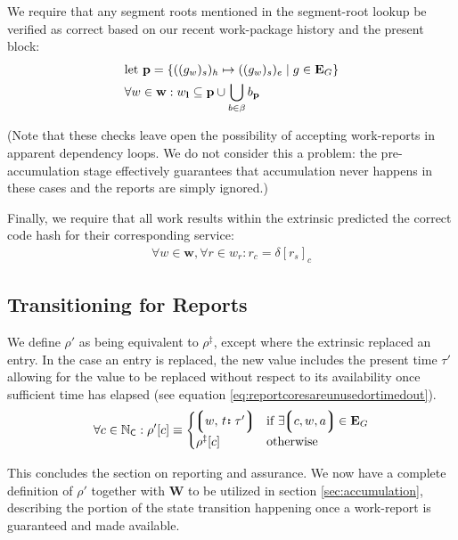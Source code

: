 We require that any segment roots mentioned in the segment-root lookup be verified as correct based on our recent work-package history and the present block:
\begin{align}
  &\text{let } \mathbf{p} = \{ ((g_w)_s)_h \mapsto ((g_w)_s)_e \mid g \in \mathbf{E}_G \} \\
  &\forall w \in \mathbf{w}: w_\mathbf{l} \subseteq \mathbf{p} \cup \bigcup_{b \in \beta} b_\mathbf{p}
\end{align}

(Note that these checks leave open the possibility of accepting work-reports in apparent dependency loops. We do not consider this a problem: the pre-accumulation stage effectively guarantees that accumulation never happens in these cases and the reports are simply ignored.)

Finally, we require that all work results within the extrinsic predicted the correct code hash for their corresponding service:
\begin{align}\label{eq:reportcodesarecorrect}
  \forall w \in \mathbf{w}, \forall r \in w_r : r_c = \delta[r_s]_c
\end{align}









\subsection{Transitioning for Reports}

We define $\rho'$ as being equivalent to $\rho^\ddagger$, except where the extrinsic replaced an entry. In the case an entry is replaced, the new value includes the present time $\tau'$ allowing for the value to be replaced without respect to its availability once sufficient time has elapsed (see equation \ref{eq:reportcoresareunusedortimedout}).
\begin{equation}
    \forall c \in \N_\mathsf{C} : \rho'[c] \equiv \begin{cases}
      \tup{w\ts\is{t}{\tau'}} &\when \exists \tup{c, w, a} \in \xtguarantees \\
      \rho^\ddagger[c] &\otherwise
    \end{cases}
\end{equation}

This concludes the section on reporting and assurance. We now have a complete definition of $\rho'$ together with $\mathbf{W}$ to be utilized in section \ref{sec:accumulation}, describing the portion of the state transition happening once a work-report is guaranteed and made available.

